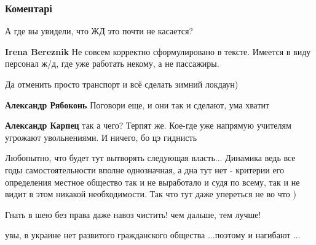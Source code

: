  
 
 
 
 
\subsubsection{Коментарі}
\label{sec:13_10_2021.fb.karpec_aleksandr.1.neadekvat_ze_vlast.cmt}

\begin{itemize} %
А где вы увидели, что ЖД это почти не касается?

\begin{itemize} %
\textbf{Irena Bereznik} Не совсем корректно сформулировано в тексте. Имеется в виду персонал ж/д, где уже работать некому, а не пассажиры.
\end{itemize} %

Да отменить просто транспорт и всё сделать зимний локдаун)

\begin{itemize} %
\textbf{Александр Рябоконь} Поговори еще, и они так и сделают, ума хватит

\textbf{Александр Карпец} так а чего? Терпят же. Кое-где уже напрямую учителям угрожают увольнениями. И ничего, бо цэ гиднисть
\end{itemize} %


Любопытно, что будет тут вытворять следующая власть... Динамика ведь все годы
самостоятельности вполне однозначная, а дна тут нет - критерии его определения
местное общество так и не выработало и судя по всему, так и не видит в этом
никакой необходимости. Так что тут даже упереться не во что )

Гнать в шею без права даже навоз чистить! чем дальше, тем лучше!

увы, в украине нет развитого гражданского общества ...поэтому и нагибают ...

\end{itemize} %
